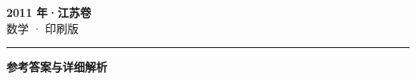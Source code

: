 \documentclass[zihao=5, a4paper]{ctexart}
\begin{document}
\begin{center}
  {\Large\bfseries 2011 年·江苏卷}\\[4pt]
  {\large 数学 · 印刷版}
\end{center}
\medskip
{}

\par\bigskip\hrule\bigskip
{}
\begin{center}{\large\bfseries 参考答案与详细解析}\end{center}
\smallskip

\end{document}
